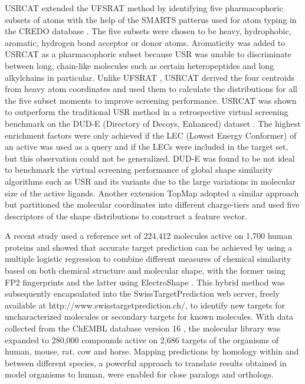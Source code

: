 \documentclass[a4,center,fleqn]{NAR}
\begin{document}
USRCAT \cite{1331} extended the UFSRAT \cite{1436} method by identifying five pharmacophoric subsets of atoms with the help of the SMARTS patterns used for atom typing in the CREDO database \cite{522,1530}. The five subsets were chosen to be heavy, hydrophobic, aromatic, hydrogen bond acceptor or donor atoms. Aromaticity was added to USRCAT as a pharmacophoric subset because USR was unable to discriminate between long, chain-like molecules such as certain heteropeptides and long alkylchains in particular. Unlike UFSRAT \cite{1436}, USRCAT \cite{1331} derived the four centroids from heavy atom coordinates and used them to calculate the distributions for all the five subset moments to improve screening performance. USRCAT was shown to outperform the traditional USR method in a retrospective virtual screening benchmark on the DUD-E (Directory of Decoys, Enhanced) dataset \cite{1185}. The highest enrichment factors were only achieved if the LEC (Lowest Energy Conformer) of an active was used as a query and if the LECs were included in the target set, but this observation could not be generalized. DUD-E was found to be not ideal to benchmark the virtual screening performance of global shape similarity algorithms such as USR and its variants due to the large variations in molecular size of the active ligands. Another extension TopMap \cite{1675} adopted a similar approach but partitioned the molecular coordinates into different charge-tiers and used five descriptors of the shape distributions to construct a feature vector.

A recent study \cite{1407} used a reference set of 224,412 molecules active on 1,700 human proteins and showed that accurate target prediction can be achieved by using a multiple logistic regression to combine different measures of chemical similarity based on both chemical structure and molecular shape, with the former using FP2 fingerprints and the latter using ElectroShape \cite{1338}. This hybrid method was subsequently encapsulated into the SwissTargetPrediction \cite{1408} web server, freely available at http://www.swisstargetprediction.ch/, to identify new targets for uncharacterized molecules or secondary targets for known molecules. With data collected from the ChEMBL database version 16 \cite{1441}, the molecular library was expanded to 280,000 compounds active on 2,686 targets of the organisms of human, mouse, rat, cow and horse. Mapping predictions by homology within and between different species, a powerful approach to translate results obtained in model organisms to human, were enabled for close paralogs and orthologs.
\end{document}
